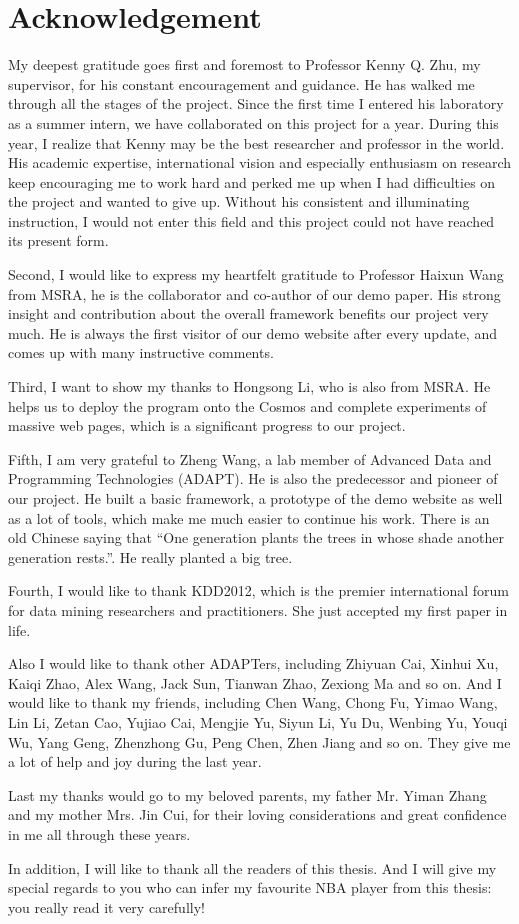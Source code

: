 \section*{Acknowledgement}
{}

\label{sec:ack}

My deepest gratitude goes first and foremost to Professor Kenny Q. Zhu, my supervisor, for his constant encouragement and guidance.
He has walked me through all the stages of the project.
Since the first time I entered his laboratory as a summer intern, we have collaborated on this project for a year.
During this year, I realize that Kenny may be the best researcher and professor in the world. His academic expertise, international vision and especially enthusiasm on research keep encouraging me to work hard and perked me up when I had difficulties on the project and wanted to give up.
Without his consistent and illuminating instruction, I would not enter this field and this project could not have reached its present form.

Second, I would like to express my heartfelt gratitude to Professor Haixun Wang from MSRA, he is the collaborator and co-author of our demo paper.
His strong insight and contribution about the overall framework benefits our project very much.
He is always the first visitor of our demo website after every update, and comes up with many instructive comments.

Third, I want to show my thanks to Hongsong Li, who is also from MSRA. He helps us to deploy the program onto the Cosmos and complete experiments of massive web pages, which is a significant progress to our project.

Fifth, I am very grateful to Zheng Wang, a lab member of Advanced Data and Programming Technologies (ADAPT). He is also the predecessor and pioneer of our project. He built a basic framework, a prototype of the demo website as well as a lot of tools, which make me much easier to continue his work.
There is an old Chinese saying that ``One generation plants the trees in whose shade another generation rests.''. He really planted a big tree.

Fourth, I would like to thank KDD2012, which is the premier international forum for data mining researchers and practitioners. She just accepted my first paper in life.

Also I would like to thank other ADAPTers, including Zhiyuan Cai, Xinhui Xu, Kaiqi Zhao, Alex Wang, Jack Sun, Tianwan Zhao, Zexiong Ma and so on. And I would like to thank my friends, including Chen Wang, Chong Fu, Yimao Wang, Lin Li, Zetan Cao, Yujiao Cai, Mengjie Yu, Siyun Li, Yu Du, Wenbing Yu, Youqi Wu, Yang Geng, Zhenzhong Gu, Peng Chen, Zhen Jiang and so on. They give me a lot of help and joy during the last year.

Last my thanks would go to my beloved parents, my father Mr. Yiman Zhang and my mother Mrs. Jin Cui, for their loving considerations and great confidence in me all through these years.

In addition, I will like to thank all the readers of this thesis. And I will give my special regards to you who can infer my favourite NBA player from this thesis: you really read it very carefully! 